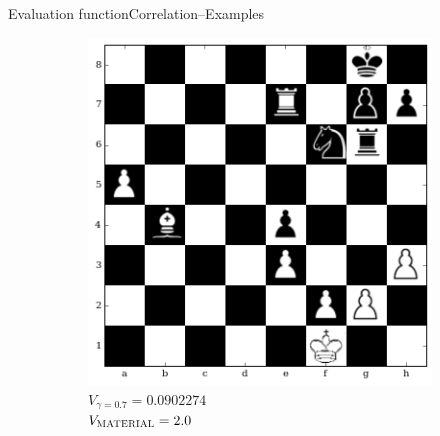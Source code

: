 \documentclass[9pt, unknownkeysallowed]{beamer}
\begin{document}
\begin{frame}{Evaluation function}{Correlation--Examples}
\begin{figure}[h]
\begin{subfigure}[t]{0.3\textwidth}
    \includegraphics[width=\textwidth]{../img/table_evaluations/output_34_0.png}
         \caption{$V_{\gamma=0.7} = 0.0902274$\\  
$V_{\textsc{MATERIAL}}= 2.0 $}
    \end{subfigure}
    ~
    \begin{subfigure}[t]{0.3\textwidth}
        \centering
        

\end{subfigure}
\end{figure}
\end{frame}
\end{document}
